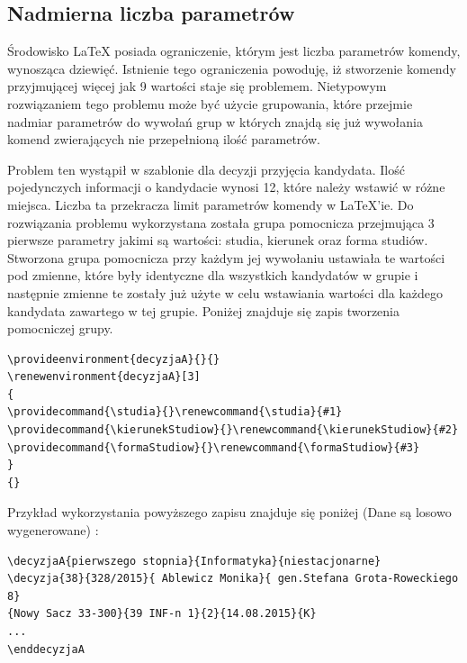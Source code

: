 \subsection{Nadmierna liczba parametrów}

Środowisko LaTeX posiada ograniczenie, którym jest liczba parametrów komendy, wynosząca dziewięć. Istnienie tego ograniczenia powoduję, iż stworzenie komendy przyjmującej więcej jak 9 wartości staje się problemem. Nietypowym rozwiązaniem tego problemu może być użycie grupowania, które przejmie nadmiar parametrów do wywołań grup w których znajdą się już wywołania komend zwierających nie przepełnioną ilość parametrów. 
\vspace{5mm}
\par
Problem ten wystąpił w szablonie dla decyzji przyjęcia kandydata. Ilość pojedynczych informacji o kandydacie wynosi 12, które należy wstawić w różne miejsca. Liczba ta przekracza limit parametrów komendy w LaTeX'ie. Do rozwiązania problemu wykorzystana została grupa pomocnicza przejmująca 3 pierwsze parametry jakimi są wartości: studia, kierunek oraz forma studiów. Stworzona grupa pomocnicza przy każdym jej wywołaniu ustawiała te wartości pod zmienne, które były identyczne dla wszystkich kandydatów w grupie i następnie zmienne te zostały już użyte w celu wstawiania wartości dla każdego kandydata zawartego w tej grupie. Poniżej znajduje się zapis tworzenia pomocniczej grupy.
\begin{lstlisting}
\provideenvironment{decyzjaA}{}{}
\renewenvironment{decyzjaA}[3]
{
\providecommand{\studia}{}\renewcommand{\studia}{#1}
\providecommand{\kierunekStudiow}{}\renewcommand{\kierunekStudiow}{#2}
\providecommand{\formaStudiow}{}\renewcommand{\formaStudiow}{#3}
}
{} 
\end{lstlisting}

Przykład wykorzystania powyższego zapisu znajduje się poniżej (Dane są losowo wygenerowane) :
\begin{lstlisting}
\decyzjaA{pierwszego stopnia}{Informatyka}{niestacjonarne}
\decyzja{38}{328/2015}{ Ablewicz Monika}{ gen.Stefana Grota-Roweckiego 8}
{Nowy Sacz 33-300}{39 INF-n 1}{2}{14.08.2015}{K}
...
\enddecyzjaA
\end{lstlisting}
